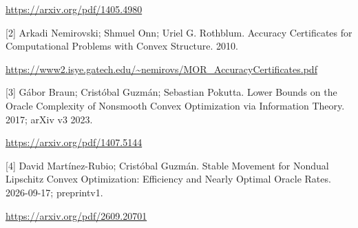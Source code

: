 \documentclass[10pt,a4paper]{article}
\begin{document}
\url{https://arxiv.org/pdf/1405.4980}

[2] Arkadi Nemirovski; Shmuel Onn; Uriel G. Rothblum. Accuracy Certificates for Computational Problems with Convex Structure. 2010.

\url{https://www2.isye.gatech.edu/~nemirovs/MOR_AccuracyCertificates.pdf}

[3] Gábor Braun; Cristóbal Guzmán; Sebastian Pokutta. Lower Bounds on the Oracle Complexity of Nonsmooth Convex Optimization via Information Theory. 2017; arXiv v3 2023.

\url{https://arxiv.org/pdf/1407.5144}

[4] David Martínez-Rubio; Cristóbal Guzmán. Stable Movement for Nondual Lipschitz Convex Optimization: Efficiency and Nearly Optimal Oracle Rates. 2026-09-17; preprintv1.

\url{https://arxiv.org/pdf/2609.20701}
\end{document}
